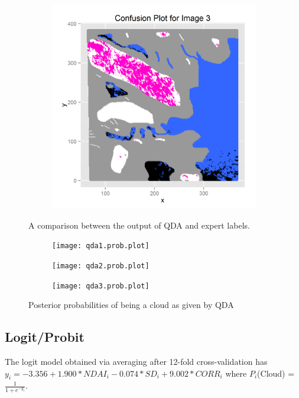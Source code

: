 \documentclass{article}\usepackage[]{graphicx}\usepackage[]{color}
\begin{document}
\begin{figure}[h]
\begin{subfigure}[b]{0.3\textwidth}
    \label{qda2_conf}
  \end{subfigure}  
  \begin{subfigure}[b]{0.3\textwidth}
    \includegraphics[width=\linewidth]{qda3_12fold_conf}
    \label{qda3_conf}
  \end{subfigure}  
  \caption{A comparison between the output of QDA and expert labels.}
  \label{fig:QDAconf}
\end{figure}

\begin{figure}[h]
  \centering 
  \begin{subfigure}[b]{0.3\textwidth}
    \texttt{[image: qda1.prob.plot]}
    \label{qda1}
  \end{subfigure} 
  \begin{subfigure}[b]{0.3\textwidth}
    \texttt{[image: qda2.prob.plot]}
    \label{qda2}
  \end{subfigure}  
  \begin{subfigure}[b]{0.3\textwidth}
    \texttt{[image: qda3.prob.plot]}
    \label{qda3}
  \end{subfigure}  
  \caption{Posterior probabilities of being a cloud as given by QDA}
  \label{fig:QDA}
\end{figure}

\subsection{Logit/Probit}
The logit model obtained via averaging after 12-fold cross-validation has $y_i = -3.356 + 1.900 * NDAI_i - 0.074 * SD_i + 9.002 * CORR_i$ where $P_i$(Cloud) = $ \frac{1}{1 + e^{-y_i}}$. 
\end{document}
